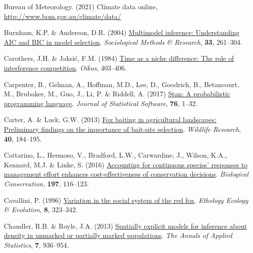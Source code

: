 \documentclass[11pt,a4paper,titlepage,twoside,openright]{style/unimelbthesis}
\newenvironment{CSLReferences}%
  {}%
  {\par}
\begin{document}
\begin{mainmatter}
\begin{CSLReferences}{1}{0}
\leavevmode{}%
Bureau of Meteorology. (2021) Climate data online, \url{http://www.bom.gov.au/climate/data/}

\leavevmode{}%
Burnham, K.P. \& Anderson, D.R. (2004) \href{https://doi.org/10.1177/0049124104268644}{Multimodel inference: Understanding {AIC} and {BIC} in model selection}. \emph{Sociological Methods \& Research}, \textbf{33}, 261--304.

\leavevmode{}%
Carothers, J.H. \& Jaksić, F.M. (1984) \href{https://doi.org/10.2307/3544413}{Time as a niche difference: The role of interference competition}. \emph{Oikos}, 403--406.

\leavevmode{}%
Carpenter, B., Gelman, A., Hoffman, M.D., Lee, D., Goodrich, B., Betancourt, M., Brubaker, M., Guo, J., Li, P. \& Riddell, A. (2017) \href{https://doi.org/10.18637/jss.v076.i01}{Stan: A probabilistic programming language}. \emph{Journal of Statistical Software}, \textbf{76}, 1--32.

\leavevmode{}%
Carter, A. \& Luck, G.W. (2013) \href{https://doi.org/10.1071/WR12169}{Fox baiting in agricultural landscapes: Preliminary findings on the importance of bait-site selection}. \emph{Wildlife Research}, \textbf{40}, 184--195.

\leavevmode{}%
Cattarino, L., Hermoso, V., Bradford, L.W., Carwardine, J., Wilson, K.A., Kennard, M.J. \& Linke, S. (2016) \href{https://doi.org/10.1016/j.biocon.2016.02.030}{Accounting for continuous species' responses to management effort enhances cost-effectiveness of conservation decisions}. \emph{Biological Conservation}, \textbf{197}, 116--123.

\leavevmode{}%
Cavallini, P. (1996) \href{https://doi.org/10.1080/08927014.1996.9522906}{Variation in the social system of the red fox}. \emph{Ethology Ecology \& Evolution}, \textbf{8}, 323--342.

\leavevmode{}%
Chandler, R.B. \& Royle, J.A. (2013) \href{http://www.jstor.org/stable/23566419}{Spatially explicit models for inference about density in unmarked or partially marked populations}. \emph{The Annals of Applied Statistics}, \textbf{7}, 936--954.


\end{CSLReferences}
\end{mainmatter}
\end{document}
